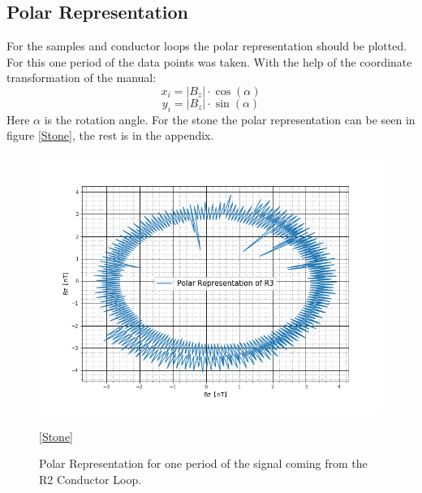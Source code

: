 \subsection{Polar Representation}
For the samples and conductor loops the polar representation should be plotted. For this one period of the data points was taken. With the help of the coordinate transformation of the manual\cite{anleitung}:
\begin{equation}
	x_i=|B_z|\cdot \cos(\alpha)
\end{equation}
\begin{equation}
	y_i=|B_z|\cdot \sin(\alpha)
\end{equation}
Here $\alpha$ is the rotation angle. For the stone the polar representation can be seen in figure \ref{Stone}, the rest is in the appendix.
\begin{figure}[ht]
	\includegraphics[scale=0.5]{Bild/R3}
	\centering
	\caption[Polar Representation for R2 Conductor Loop]{Polar Representation for one period of the signal coming from the R2 Conductor Loop.}
	\ref{Stone}
\end{figure}\\
